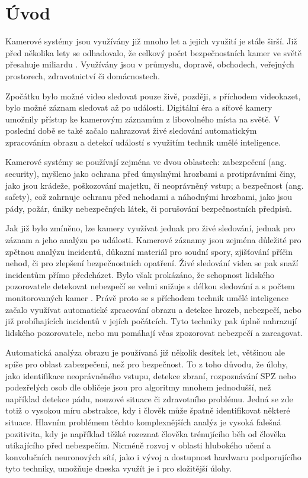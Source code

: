 \chapter{Úvod}
\label{chap:Introduction}

Kamerové systémy jsou využívány již mnoho let a jejich využití je stále širší.
Již před několika lety se odhadovalo, že celkový počet bezpečnostních kamer ve
světě přesahuje miliardu \cite{surveillance}. Využívány jsou v průmyslu,
dopravě, obchodech, veřejných prostorech, zdravotnictví či domácnostech.

Zpočátku bylo možné video sledovat pouze živě, později, s příchodem videokazet,
bylo možné záznam sledovat až po události. Digitální éra a síťové kamery
umožnily přístup ke kamerovým záznamům z libovolného místa na světě. V poslední
době se také začalo nahrazovat živé sledování automatickým zpracováním obrazu a
detekcí událostí s využitím technik umělé inteligence.

Kamerové systémy se používají zejména ve dvou oblastech: zabezpečení (ang.
security), myšleno jako ochrana před úmyslnými hrozbami a protiprávními činy,
jako jsou krádeže, poškozování majetku, či neoprávněný vstup; a bezpečnost
(ang. safety), což zahrnuje ochranu před nehodami a náhodnými hrozbami, jako
jsou pády, požár, úniky nebezpečných látek, či porušování bezpečnostních
předpisů.

Jak již bylo zmíněno, lze kamery využívat jednak pro živé sledování, jednak pro
záznam a jeho analýzu po události. Kamerové záznamy jsou zejména důležité pro
zpětnou analýzu incidentů, důkazní materiál pro soudní spory, zjišťování příčin
nehod, či pro zlepšení bezpečnostních opatření. Živé sledování videa se pak
snaží incidentům přímo předcházet. Bylo však prokázáno, že schopnost lidského
pozorovatele detekovat nebezpečí se velmi snižuje s délkou sledování a s počtem
monitorovaných kamer \cite{soton371614}. Právě proto se s příchodem technik
umělé inteligence začalo využívat automatické zpracování obrazu a detekce
hrozeb, nebezpečí, nebo již probíhajících incidentů v jejích počátcích. Tyto
techniky pak úplně nahrazují lidského pozorovatele, nebo mu pomáhají včas
zpozorovat nebezpečí a zareagovat.

Automatická analýza obrazu je používaná již několik desítek let, většinou ale
spíše pro oblast zabezpečení, než pro bezpečnost. To z toho důvodu, že úlohy,
jako identifikace neoprávněného vstupu, detekce zbraní, rozpoznávání SPZ nebo
podezřelých osob dle obličeje jsou pro algoritmy mnohem jednodušší, než
například detekce pádu, nouzové situace či zdravotního problému. Jedná se zde
totiž o vysokou míru abstrakce, kdy i člověk může špatně identifikovat některé
situace. Hlavním problémem těchto komplexnějších analýz je vysoká falešná
pozitivita, kdy je například těžké rozeznat člověka trénujícího běh od člověka
utíkajícího před nebezpečím. Nicméně rozvoj v oblasti hlubokého učení a
konvolučních neuronových sítí, jako i vývoj a dostupnost hardwaru podporujícího
tyto techniky, umožňuje dneska využít je i pro složitější úlohy.

